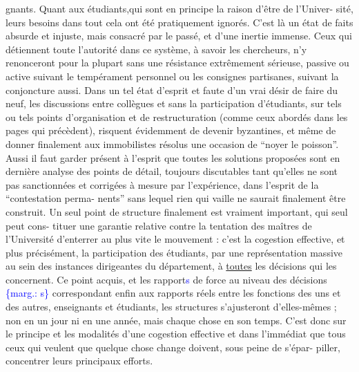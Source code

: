 \documentclass[11pt]{article}
\newcommand{\scanpage}[1]{\par\bigskip\noindent{\small\sffamily[scan #1]}\par}
\newcommand{\mspage}[1]{{\small\sffamily[p.\,#1]}}
\newcommand{\hand}[1]{\textcolor{blue}{#1}}
\newcommand{\margin}[1]{\textcolor{blue}{\{\textsf{marg.:} #1\}}}
\newcommand{\uline}[1]{\underline{#1}}
\begin{document}
\clearpage
\scanpage{119/270}
\mspage{17}

gnants. Quant aux étudiants,qui sont en principe la raison d'être de l'Univer-%
sité, leurs besoins dans tout cela ont été pratiquement ignorés. C'est là
un état de faits absurde et injuste, mais consacré par le passé, et d'une inertie
immense. Ceux qui détiennent toute l'autorité dans ce système, à savoir les
chercheurs, n'y renonceront pour la plupart sans une résistance extrêmement
sérieuse, passive ou active suivant le tempérament personnel ou les consignes
partisanes, suivant la conjoncture aussi. Dans un tel état d'esprit et faute
d'un vrai désir de faire du neuf, les discussions entre collègues et sans la
participation d'étudiants, sur tels ou tels points d'organisation et de
restructuration (comme ceux abordés dans les pages qui précèdent), risquent
évidemment de devenir byzantines, et même de donner finalement aux immobilistes
résolus une occasion de ``noyer le poisson''. Aussi il faut garder présent à
l'esprit que toutes les solutions proposées sont en dernière analyse des points
de détail, toujours discutables tant qu'elles ne sont pas sanctionnées et
corrigées à mesure par l'expérience, dans l'esprit de la ``contestation perma-%
nents'' sans lequel rien qui vaille ne saurait finalement être construit. Un
seul point de structure finalement est vraiment important, qui seul peut cons-%
tituer une garantie relative contre la tentation des maîtres de l'Université
d'enterrer au plus vite le mouvement : c'est la cogestion effective, et plus
précisément, la participation des étudiants, par une représentation massive
au sein des instances dirigeantes du département, à \uline{toutes} les décisions qui
les concernent. Ce point acquis, et les rapport\hand{s} de force au niveau des décisions \margin{s}
correspondant enfin aux rapports réels entre les fonctions des uns et des
autres, enseignants et étudiants, les structures s'ajusteront d'elles-mêmes ;
non en un jour ni en une année, mais chaque chose en son temps. C'est donc sur
le principe et les modalités d'une cogestion effective et dans l'immédiat que
tous ceux qui veulent que quelque chose change doivent, sous peine de s'épar-%
piller, concentrer leurs principaux efforts.
\end{document}
